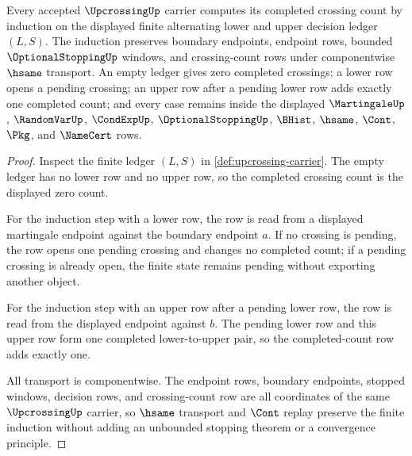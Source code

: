 \begin{theorem}
\label{thm:upcrossing-finite-ledger-induction-boundary}
Every accepted $\UpcrossingUp$ carrier computes its completed crossing count by induction on the displayed finite alternating lower and upper decision ledger $(L,S)$. The induction preserves boundary endpoints, endpoint rows, bounded $\OptionalStoppingUp$ windows, and crossing-count rows under componentwise $\hsame$ transport. An empty ledger gives zero completed crossings; a lower row opens a pending crossing; an upper row after a pending lower row adds exactly one completed count; and every case remains inside the displayed $\MartingaleUp$, $\RandomVarUp$, $\CondExpUp$, $\OptionalStoppingUp$, $\BHist$, $\hsame$, $\Cont$, $\Pkg$, and $\NameCert$ rows.
\end{theorem}
\begin{proof}
Inspect the finite ledger $(L,S)$ in \autoref{def:upcrossing-carrier}. The empty ledger has no lower row and no upper row, so the completed crossing count is the displayed zero count.

For the induction step with a lower row, the row is read from a displayed martingale endpoint against the boundary endpoint $a$. If no crossing is pending, the row opens one pending crossing and changes no completed count; if a pending crossing is already open, the finite state remains pending without exporting another object.

For the induction step with an upper row after a pending lower row, the row is read from the displayed endpoint against $b$. The pending lower row and this upper row form one completed lower-to-upper pair, so the completed-count row adds exactly one.

All transport is componentwise. The endpoint rows, boundary endpoints, stopped windows, decision rows, and crossing-count row are all coordinates of the same $\UpcrossingUp$ carrier, so $\hsame$ transport and $\Cont$ replay preserve the finite induction without adding an unbounded stopping theorem or a convergence principle.
\end{proof}

